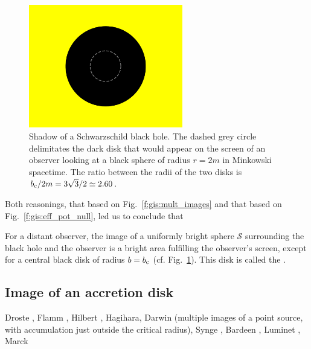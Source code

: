 \begin{figure}
\centerline{\includegraphics[width=0.6\textwidth]{gis_shadow.pdf}}
\caption[]{\label{f:gis:shadow} \footnotesize
Shadow of a Schwarzschild black hole. The dashed grey circle delimitates the
dark disk that would appear on the screen of an observer looking at
a black sphere of radius $r=2m$ in Minkowski spacetime. The ratio between
the radii of the two disks is $b_{\rm c} / 2m = 3\sqrt{3}/2 \simeq 2.60$.}
\end{figure}


Both reasonings, that based on Fig.~\ref{f:gis:mult_images} and that
based on Fig.~\ref{f:gis:eff_pot_null}, led us to conclude that
\begin{greybox}
For a distant observer, the image of a uniformly bright sphere $\mathscr{S}$ surrounding
the black hole and the observer is a bright area fulfilling
the observer's screen, except for a central black disk of radius $b=b_{\rm c}$
(cf. Fig.~\ref{f:gis:shadow}).
This disk is called the
.
\end{greybox}

\subsection{Image of an accretion disk}


\begin{hist}
Droste \cite{Drost1917}, Flamm \cite{Flamm1916}, Hilbert \cite{Hilbe1917a,Hilbe1917b}, Hagihara,  Darwin \cite{Darwi59} (multiple images of a point source, with accumulation just outside the critical radius), Synge \cite{Synge66}, Bardeen \cite{Barde73}, Luminet \cite{Lumin79,Lumin19}, Marck \cite{Marck96}

\end{hist}





